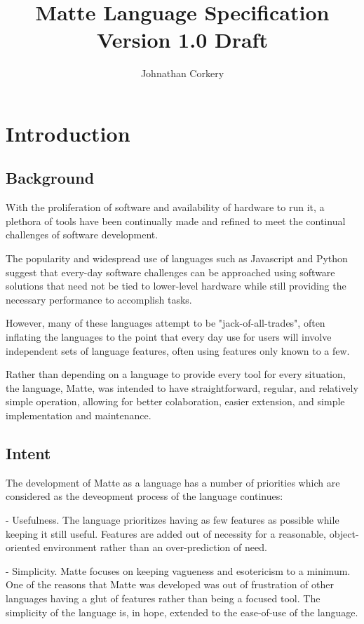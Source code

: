 \documentclass[12pt,letterpaper]{report}
\author{Johnathan Corkery}
\title{Matte Language Specification\\
\small Version 1.0 Draft
}
\begin{document}
\maketitle
\tableofcontents


\chapter{Introduction}
\section{Background}  

With the proliferation of software and availability of hardware to run it, a
plethora of tools have been continually made and refined to meet the 
continual challenges of software development. 

The popularity and widespread use of languages such as Javascript and 
Python suggest that every-day software challenges can be approached using 
software solutions that need not be tied to lower-level hardware while 
still providing the necessary performance to accomplish tasks.

However, many of these languages attempt to be "jack-of-all-trades", often 
inflating the languages to the point that every day use for users will involve
independent sets of language features, often using features only known to a few.

Rather than depending on a language to provide every tool for every situation,
the language, Matte, was intended to have straightforward, regular, and 
relatively simple operation, allowing for better colaboration, easier 
extension, and simple implementation and maintenance.
  
\section{Intent}

The development of Matte as a language has a number of priorities which are 
considered as the deveopment process of the language continues:

- Usefulness. The language prioritizes having as few features as possible 
  while keeping it still useful. Features are added out of necessity for a reasonable, 
  object-oriented environment rather than an over-prediction of need.

- Simplicity. Matte focuses on keeping vagueness and esotericism to a minimum. One 
  of the reasons that Matte was developed was out of frustration of other 
  languages having a glut of features rather than being a focused tool. The 
  simplicity of the language is, in hope, extended to the ease-of-use of the language.
\end{document}
